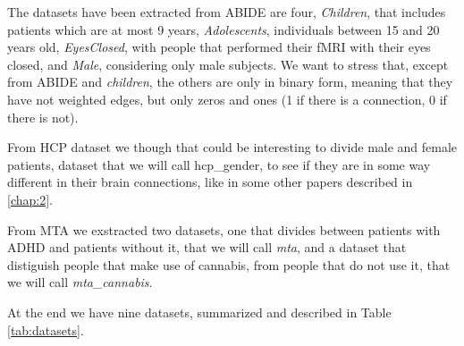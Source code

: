 The datasets have been extracted from ABIDE are four, \textit{Children}, that includes patients which are at most 9 years, \textit{Adolescents}, individuals between 15 and 20 years old, \textit{EyesClosed}, with people that performed their fMRI with their eyes closed, and \textit{Male}, considering only male subjects. We want to stress that, except from ABIDE and \textit{children}, the others are only in binary form, meaning that they have not weighted edges, but only zeros and ones (1 if there is a connection, 0 if there is not).
\vspace{0.5cm}

From HCP dataset we though that could be interesting to divide male and female patients, dataset that we will call hcp\_gender, to see if they are in some way different in their brain connections, like in some other papers described in \ref{chap:2}. 
\vspace{0.5cm}

From MTA we exstracted two datasets, one that divides between patients with ADHD and patients without it, that we will call \textit{mta}, and a dataset that distiguish people that make use of cannabis, from people that do not use it, that we will call \textit{mta\_cannabis}.
\vspace{0.5cm}

At the end we have nine datasets, summarized and described in Table \ref{tab:datasets}.
\vspace{0.5cm}


